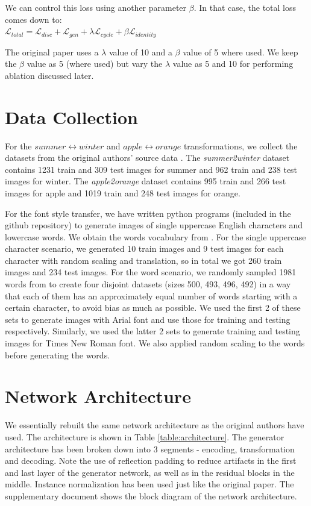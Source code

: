 \documentclass[10pt,twocolumn,letterpaper]{article}
\begin{document}
We can control this loss using another parameter $\beta$. In that case, the total loss comes down to:\\

$\mathcal{L}_{total} = \mathcal{L}_{disc} + \mathcal{L}_{gen} + \lambda\mathcal{L}_{cycle} + \beta\mathcal{L}_{identity}$

The original paper uses a $\lambda$ value of 10 and a $\beta$ value of 5 where used.
We keep the $\beta$ value as 5 (where used) but vary the $\lambda$ value as 5 and 10 for performing ablation discussed later.

\section{Data Collection}

For the $summer \leftrightarrow winter$ and $apple \leftrightarrow orange$ transformations, we collect 
the datasets from the original authors' source data \cite{data1}. The \textit{summer2winter} dataset contains 1231 train and 309 test images for summer and 962 train and 238 test images for winter. The \textit{apple2orange} dataset contains 995 train and 266 test images for apple and 1019 train and 248 test images for orange.

For the font style transfer, we have written python programs (included in the github repository) to generate images of single uppercase English characters and lowercase words. We obtain the words vocabulary from \cite{data2}. For the single uppercase character scenario, we generated 10 train images and 9 test images for each character with random scaling and translation, so in total we got 260 train images and 234 test images. For the word scenario, we randomly sampled 1981 words from \cite{data2} to create four disjoint datasets (sizes 500, 493, 496, 492) in a way that each of them has an approximately equal number of words starting with a certain character, to avoid bias as much as possible. We used the first 2 of these sets to generate images with Arial font and use those for training and testing respectively. Similarly, we used the latter 2 sets to generate training and testing images for Times New Roman font. We also applied random scaling to the words before generating the words. 

\section{Network Architecture}
We essentially rebuilt the same network architecture as the original authors 
\cite{cyclegan} have used. The architecture is shown in Table \ref{table:architecture}.
The generator architecture has been broken down into 3 segments - encoding, transformation
and decoding. Note the use of reflection padding to reduce artifacts in the first and last layer of the
generator network, as well as in the residual blocks in the middle. Instance normalization has been used
just like the original paper. The supplementary document shows the block diagram of the network architecture.
\end{document}
